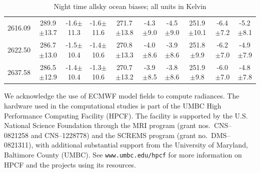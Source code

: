 \documentclass[agupp]{aguplus}              %
\begin{document}
\begin{article}
\begin{center}
\begin{table}[ht]
{\begin{tabular}{c|ccc|ccc|ccc}
2616.09 & 289.9$\pm$13.7 & -1.6$\pm$11.3 & -1.6$\pm$11.6 & 271.7$\pm$13.8 & -4.3$\pm$9.0 & -4.5$\pm$9.0 & 251.9$\pm$10.1 & -6.4$\pm$7.2 & -5.2$\pm$8.1 \\ 
2622.50 & 286.7$\pm$13.0 & -1.5$\pm$10.4 & -1.4$\pm$10.6 & 270.8$\pm$13.3 & -4.0$\pm$8.6 & -3.9$\pm$8.6 & 251.8$\pm$9.9 & -6.2$\pm$7.0 & -4.9$\pm$7.9 \\ 
2637.58 & 286.5$\pm$12.9 & -1.4$\pm$10.4 & -1.3$\pm$10.6 & 270.7$\pm$13.2 & -3.9$\pm$8.5 & -3.8$\pm$8.6 & 251.9$\pm$9.8 & -6.0$\pm$7.0 & -4.8$\pm$7.8 \\ 
\hline
\end{tabular}}
\hfill{}
\caption{Night time allsky ocean biases; all units in Kelvin}
\label{table:night_allbias2} %
\end{table}
\end{center}

\begin{acknowledgments} 
We acknowledge the use of ECMWF model fields
to compute radiances. The hardware used in the computational studies
is part of the UMBC High Performance Computing Facility (HPCF). The
facility is supported by the U.S. National Science Foundation through
the MRI program (grant nos.~CNS--0821258 and CNS--1228778) and the
SCREMS program (grant no.~DMS--0821311), with additional substantial
support from the University of Maryland, Baltimore County (UMBC). See
\verb+www.umbc.edu/hpcf+ for more information on HPCF and the projects
using its resources.

\end{acknowledgments}

 
 

\end{article}
\end{document}
